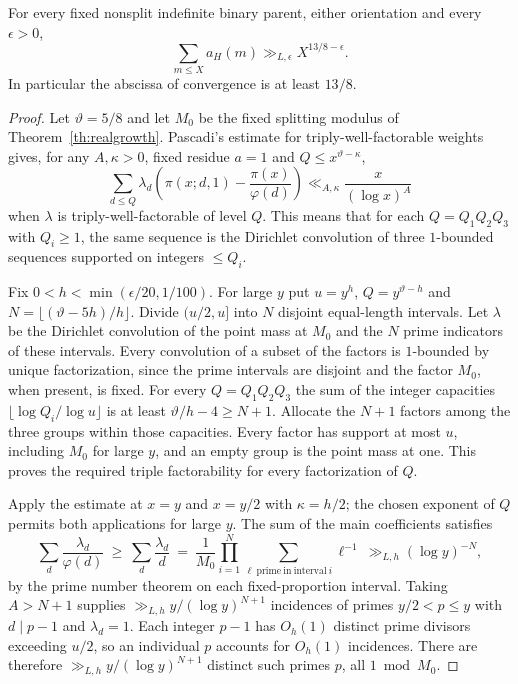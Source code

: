 \begin{corollary}\label{cor:real-large-moduli}
For every fixed nonsplit indefinite binary parent, either orientation and every $\epsilon>0$,
\[
 \sum_{m\le X}a_H(m)\gg_{L,\epsilon} X^{13/8-\epsilon}.
\]
In particular the abscissa of convergence is at least $13/8$.
\end{corollary}
\begin{proof}
Let $\vartheta=5/8$ and let $M_0$ be the fixed splitting modulus of Theorem~\ref{th:realgrowth}. Pascadi's estimate for triply-well-factorable weights \cite[Def.~1.1 and Thm.~1.3(i)]{Pascadi} gives, for any $A,\kappa>0$, fixed residue $a=1$ and $Q\le x^{\vartheta-\kappa}$,
\[
 \sum_{d\le Q}\lambda_d\left(\pi(x;d,1)-\frac{\pi(x)}{\varphi(d)}\right)
       \ll_{A,\kappa}\frac{x}{(\log x)^A}
\]
when $\lambda$ is triply-well-factorable of level $Q$. This means that for each $Q=Q_1Q_2Q_3$ with $Q_i\ge1$, the same sequence is the Dirichlet convolution of three $1$-bounded sequences supported on integers $\le Q_i$.

Fix $0<h<\min(\epsilon/20,1/100)$. For large $y$ put $u=y^h$, $Q=y^{\vartheta-h}$ and $N=\lfloor(\vartheta-5h)/h\rfloor$. Divide $(u/2,u]$ into $N$ disjoint equal-length intervals. Let $\lambda$ be the Dirichlet convolution of the point mass at $M_0$ and the $N$ prime indicators of these intervals. Every convolution of a subset of the factors is $1$-bounded by unique factorization, since the prime intervals are disjoint and the factor $M_0$, when present, is fixed. For every $Q=Q_1Q_2Q_3$ the sum of the integer capacities $\lfloor\log Q_i/\log u\rfloor$ is at least $\vartheta/h-4\ge N+1$. Allocate the $N+1$ factors among the three groups within those capacities. Every factor has support at most $u$, including $M_0$ for large $y$, and an empty group is the point mass at one. This proves the required triple factorability for every factorization of $Q$.

Apply the estimate at $x=y$ and $x=y/2$ with $\kappa=h/2$;
the chosen exponent of $Q$ permits both applications for large $y$. The sum of the main coefficients satisfies
\[
 \sum_d\frac{\lambda_d}{\varphi(d)}
 \ \ge\ \sum_d\frac{\lambda_d}{d}
 \ =\ \frac1{M_0}\prod_{i=1}^N\sum_{\ell\ \mathrm{prime\ in\ interval}\ i}\ell^{-1}
 \ \gg_{L,h}(\log y)^{-N},
\]
by the prime number theorem on each fixed-proportion interval. Taking $A>N+1$ supplies $\gg_{L,h}y/(\log y)^{N+1}$ incidences of primes $y/2<p\le y$ with $d\mid p-1$ and $\lambda_d=1$. Each integer $p-1$ has $O_h(1)$ distinct prime divisors exceeding $u/2$, so an individual $p$ accounts for $O_h(1)$ incidences. There are therefore $\gg_{L,h}y/(\log y)^{N+1}$ distinct such primes $p$, all $1\bmod M_0$.


\end{proof}
